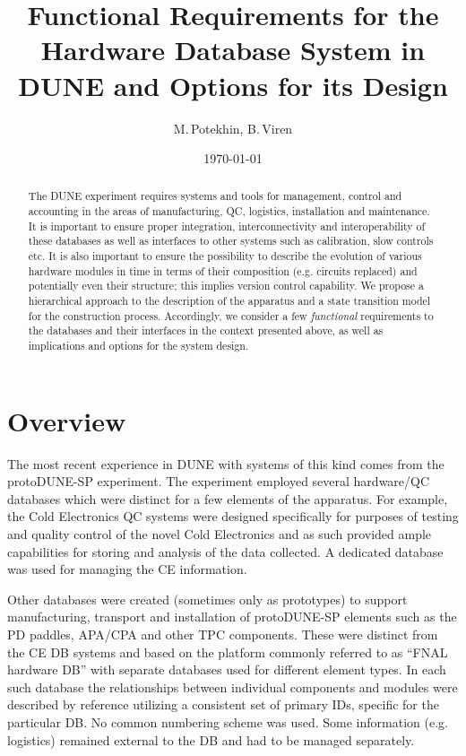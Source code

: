 \documentclass[pdftex,12pt,letter]{article}
\title{Functional Requirements for the Hardware Database System in DUNE and Options for its Design}
\date{\today}
\author{M.\,Potekhin, B.\,Viren}
\begin{document}
\maketitle

\begin{abstract}
\noindent  The DUNE experiment requires systems and tools for management, control
and accounting  in the areas of manufacturing, QC, logistics, installation and maintenance.
It is important to ensure proper integration, interconnectivity and interoperability of these
databases  as well as interfaces to other systems such as calibration, slow controls etc.
It is also important to ensure the possibility to describe the evolution of various hardware modules
in time in terms of their composition (e.g. circuits replaced) and potentially even their structure;
this implies version control capability.
We propose a hierarchical approach to the description of the apparatus and a state transition
model for the construction process. Accordingly, we consider a few \textit{functional}
requirements to the databases and their interfaces  in the context presented above,
as well as implications and options for the system design.

\end{abstract}


\section{Overview}

The most recent experience in DUNE with systems of this kind comes from the protoDUNE-SP
experiment. The experiment employed several hardware/QC databases which were distinct
for a few elements of the apparatus. For example, the Cold Electronics QC systems were designed specifically
for purposes of testing and quality control of the novel Cold Electronics and as such provided ample capabilities
for storing and analysis of the data collected. A dedicated database was used for managing the CE information.

Other databases were created (sometimes only as prototypes) to support manufacturing, transport and installation of 
protoDUNE-SP elements such as the PD paddles, APA/CPA and other TPC components. These were distinct from
the CE DB systems and based on the platform commonly referred to as ``FNAL hardware DB'' \cite{hardwareDB}
with separate databases used for different element types. In each such database the
relationships between individual components and modules were described by reference utilizing a
consistent set of primary IDs, specific for the particular DB. No common numbering scheme was used.
Some information (e.g.\,logistics) remained external to the DB and had to be managed separately.
\end{document}

